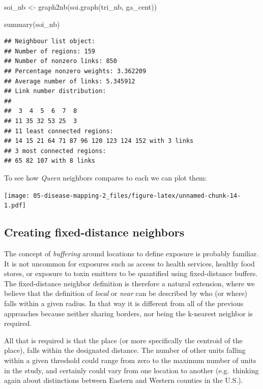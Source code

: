 \documentclass[
]{book}
\newenvironment{Shaded}{\begin{snugshade}}{\end{snugshade}}
\newcommand{\FunctionTok}[1]{\textcolor[rgb]{0.00,0.00,0.00}{#1}}
\newcommand{\NormalTok}[1]{#1}
\newcommand{\OtherTok}[1]{\textcolor[rgb]{0.56,0.35,0.01}{#1}}
\begin{document}
\begin{Shaded}
\begin{Highlighting}[]
\NormalTok{soi\_nb }\OtherTok{\textless{}{-}} \FunctionTok{graph2nb}\NormalTok{(}\FunctionTok{soi.graph}\NormalTok{(tri\_nb, ga\_cent))}

\FunctionTok{summary}\NormalTok{(soi\_nb)}
\end{Highlighting}
\end{Shaded}

\begin{verbatim}
## Neighbour list object:
## Number of regions: 159 
## Number of nonzero links: 850 
## Percentage nonzero weights: 3.362209 
## Average number of links: 5.345912 
## Link number distribution:
## 
##  3  4  5  6  7  8 
## 11 35 32 53 25  3 
## 11 least connected regions:
## 14 15 21 64 71 87 96 120 123 124 152 with 3 links
## 3 most connected regions:
## 65 82 107 with 8 links
\end{verbatim}

To see how \emph{Queen} neighbors compares to each we can plot them:

\texttt{[image: 05-disease-mapping-2\_files/figure-latex/unnamed-chunk-14-1.pdf]}

\hypertarget{creating-fixed-distance-neighbors}{%
\subsection{Creating fixed-distance neighbors}\label{creating-fixed-distance-neighbors}}

The concept of \emph{buffering} around locations to define exposure is probably familiar. It is not uncommon for exposures such as access to health services, healthy food stores, or exposure to toxin emitters to be quantified using fixed-distance buffers. The fixed-distance neighbor definition is therefore a natural extension, where we believe that the definition of \emph{local} or \emph{near} can be described by who (or where) falls within a given radius. In that way it is different from all of the previous approaches because neither sharing borders, nor being the k-nearest neighbor is required.

All that is required is that the place (or more specifically the centroid of the place), falls within the designated distance. The number of other units falling within a given threshold could range from zero to the maximum number of units in the study, and certainly could vary from one location to another (e.g.~thinking again about distinctions between Eastern and Western counties in the U.S.).
\end{document}
